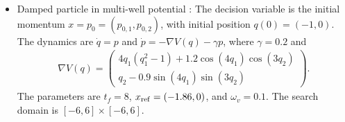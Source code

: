 \documentclass{article}
\numberwithin{equation}{section}
\begin{document}
\begin{itemize}
\item Damped particle in multi-well potential : The decision variable is the initial momentum $x = p_0 = (p_{0,1}, p_{0,2})$, with initial position $q(0) = (-1, 0)$. The dynamics are $\dot{q} = p$ and $\dot{p} = -\nabla V(q) - \gamma p$, where $\gamma = 0.2$ and
\begin{align}
    \nabla V(q) = \begin{pmatrix} 4q_1(q_1^2-1) + 1.2\cos(4q_1)\cos(3q_2) \\ q_2 - 0.9\sin(4q_1)\sin(3q_2) \end{pmatrix}.
\end{align}
The parameters are $t_f = 8$, $x_{\rm ref} = (-1.86, 0)$, and $\omega_v = 0.1$. The search domain is $[-6, 6] \times [-6, 6]$.

\end{itemize}
\end{document}
